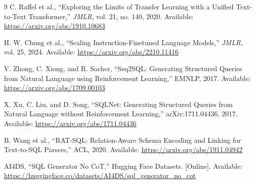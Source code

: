 \documentclass[10pt,a4paper]{article}
\begin{document}
\begin{thebibliography}{9}
C. Raffel et al., ``Exploring the Limits of Transfer Learning with a Unified Text-to-Text Transformer,'' \emph{JMLR}, vol. 21, no. 140, 2020. Available: \url{https://arxiv.org/abs/1910.10683}

H. W. Chung et al., ``Scaling Instruction-Finetuned Language Models,'' \emph{JMLR}, vol. 25, 2024. Available: \url{https://arxiv.org/abs/2210.11416}

V. Zhong, C. Xiong, and R. Socher, ``Seq2SQL: Generating Structured Queries from Natural Language using Reinforcement Learning,'' EMNLP, 2017. Available: \url{https://arxiv.org/abs/1709.00103}

X. Xu, C. Liu, and D. Song, ``SQLNet: Generating Structured Queries from Natural Language without Reinforcement Learning,'' arXiv:1711.04436, 2017. Available: \url{https://arxiv.org/abs/1711.04436}

B. Wang et al., ``RAT-SQL: Relation-Aware Schema Encoding and Linking for Text-to-SQL Parsers,'' ACL, 2020. Available: \url{https://arxiv.org/abs/1911.04942}

AI4DS, ``SQL Generator No CoT,'' Hugging Face Datasets. [Online]. Available: \url{https://huggingface.co/datasets/AI4DS/sql_generator_no_cot}

\end{thebibliography}
\end{document}
